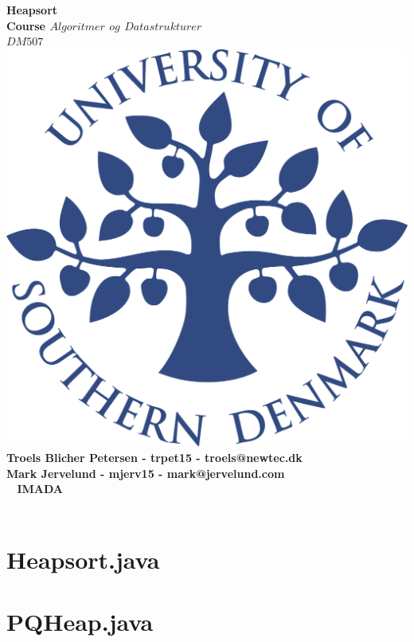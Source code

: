 \documentclass[a4paper,10pt,titlepage]{report}
\date{}
\begin{document}
\begin{titlepage}
\centering
    \vspace*{2\baselineskip}
    \huge
    \bfseries
    Heapsort \\

    \normalfont
	\huge
    Course \(Algoritmer\) \(og\) \(Datastrukturer\) \\ \( DM507\)  \\ [3\baselineskip]
    \normalfont
	\includegraphics[scale=0.2]{SDU_logo}\\ 
	Troels Blicher Petersen - trpet15 - troels@newtec.dk\\
    Mark Jervelund - mjerv15 - mark@jervelund.com \\
    \vfill\
    \vspace{5mm}
    IMADA \\
    \vspace{5mm}
    \textbf{\datedate}  \bf{} \\[2\baselineskip]
\end{titlepage}
\newpage
\renewcommand{\thepage}{\roman{page}}%
\tableofcontents

\newpage
\setcounter{page}{1}
\renewcommand{\thepage}{\arabic{page}}
\section{Heapsort.java}

\section{PQHeap.java}

\end{document}
